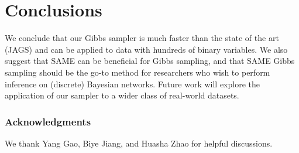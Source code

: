 \documentclass{article} %
\begin{document}
\section{Conclusions}\label{sec:conclusions}

We conclude that our Gibbs sampler is much faster than the state of the art (JAGS) and can be
applied to data with hundreds of binary variables. We also suggest that SAME can be beneficial for
Gibbs sampling, and that SAME Gibbs sampling should be the go-to method for researchers who wish to
perform inference on (discrete) Bayesian networks. Future work will explore the application of our
sampler to a wider class of real-world datasets.


\subsubsection*{Acknowledgments}

We thank Yang Gao, Biye Jiang, and Huasha Zhao for helpful discussions.












%




\end{document}
